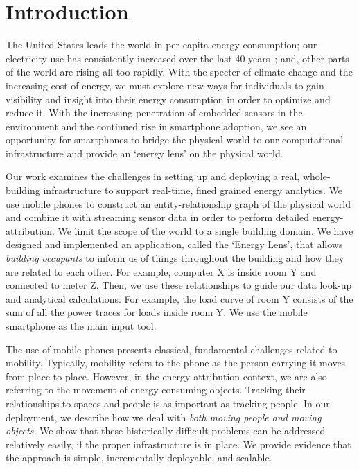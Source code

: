 \section{Introduction}
The United States leads the world in per-capita energy consumption; 
our electricity use has consistently increased over the last 40 years~\cite{oecd2011}; and, other parts of the world are rising all 
too rapidly.  With the specter of climate change and the increasing cost of energy, we must explore new
ways for individuals to gain visibility and insight into their energy consumption in order to optimize and reduce it. 
With the increasing penetration of embedded sensors in the environment and
the continued rise in smartphone adoption, we see an opportunity for smartphones to bridge the physical world
to our computational infrastructure and provide an `energy lens' on the physical world.  

Our work examines the challenges in setting up and deploying a real, whole-building infrastructure to support real-time, 
fined grained energy analytics.  We use mobile phones to construct an entity-relationship 
graph of the physical world and combine it with streaming sensor data in order to perform detailed energy-attribution.
We limit the scope of the world to a single building domain.  We have 
designed and implemented an application, called the `Energy Lens', that allows \emph{building occupants} to inform us 
of things throughout the building and how they are related to each other.  For example, computer X is inside 
room Y and connected to meter Z.  Then, we use these relationships to guide our data look-up and analytical
calculations.  For example, the load curve of room Y consists of the sum of all the power traces for loads
inside room Y.  We use the mobile smartphone as the main input tool.

The use of mobile phones presents classical, fundamental challenges related to mobility.  Typically, mobility
refers to the phone as the person carrying it moves from place to place.  However, in the energy-attribution
context, we are also referring to the movement of energy-consuming objects.  Tracking their relationships to spaces 
and people is as important as tracking people.  In our deployment, we describe how we deal with \emph{both moving people and 
moving objects}.  We show that these historically difficult problems can be addressed relatively easily, if the proper infrastructure is 
in place.  We provide evidence that the approach is simple, incrementally deployable, and scalable.

